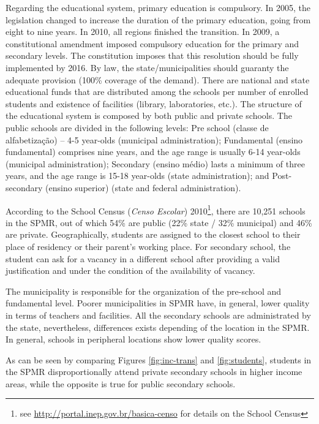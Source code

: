 \documentclass[3p,authoryear,preprint,review,12pt]{elsarticle}
\begin{document}
Regarding the educational system, primary education is compulsory. In 2005, the legislation changed to increase the duration of the primary education, going from eight to nine years. In 2010, all regions finished the transition. In 2009, a constitutional amendment imposed compulsory education for the primary and secondary levels. The constitution imposes that this resolution should be fully implemented by 2016. By law, the state/municipalities should guaranty the adequate provision (100\% coverage of the demand). There are national and state educational funds that are distributed among the schools per number of enrolled students and existence of facilities (library, laboratories, etc.). The structure of the educational system is composed by both public and private schools. The public schools are divided in the following levels: Pre school (classe de alfabetização) – 4-5 year-olds (municipal administration); Fundamental (ensino fundamental) comprises nine years, and the age range is usually 6-14 year-olds (municipal administration); Secondary (ensino médio) lasts a minimum of three years, and the age range is 15-18 year-olds (state administration); and Post-secondary (ensino superior) (state and federal administration).

According to the School Census (\textit{Censo Escolar}) 2010\footnote{see
  \url{http://portal.inep.gov.br/basica-censo} for details on the School
  Census}, there are 10,251 schools in the SPMR, out of which 54\% are public (22\% state / 32\% municipal) and 46\% are private.
Geographically, students are assigned to the closest school to their
place of residency or their parent's working place. For secondary
school, the student can ask for a vacancy in a different school after providing a valid justification and under the condition of the
availability of vacancy.

The municipality is responsible for the organization of the pre-school and fundamental level. Poorer municipalities in SPMR have, in general, lower quality in terms of teachers and facilities. All the secondary schools are administrated by the state, nevertheless, differences exists depending of the location in the SPMR. In general, schools in peripheral locations show lower quality scores.

As can be seen by comparing Figures \ref{fig:inc-trans} and \ref{fig:students}, students in the SPMR disproportionally attend private secondary schools in higher income areas, while the opposite is true for public secondary schools.
\end{document}
